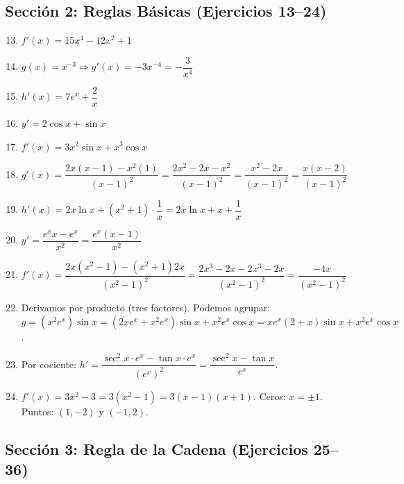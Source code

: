 \documentclass[12pt, a4paper]{article}
\begin{document}
\subsection*{Sección 2: Reglas Básicas (Ejercicios 13--24)}

\begin{enumerate}[leftmargin=*, label=\textbf{\arabic*.}]
  \setcounter{enumi}{12}
  \item $f'(x) = 15x^4 - 12x^2 + 1$
  \item $g(x) = x^{-3} \Rightarrow g'(x) = -3x^{-4} = -\dfrac{3}{x^4}$
  \item $h'(x) = 7e^x + \dfrac{2}{x}$
  \item $y' = 2\cos x + \sin x$
  \item $f'(x) = 3x^2 \sin x + x^3 \cos x$
  \item $g'(x) = \dfrac{2x(x - 1) - x^2(1)}{(x - 1)^2} = \dfrac{2x^2 - 2x - x^2}{(x - 1)^2} = \dfrac{x^2 - 2x}{(x - 1)^2} = \dfrac{x(x - 2)}{(x - 1)^2}$
  \item $h'(x) = 2x \ln x + (x^2 + 1) \cdot \dfrac{1}{x} = 2x\ln x + x + \dfrac{1}{x}$
  \item $y' = \dfrac{e^x x - e^x}{x^2} = \dfrac{e^x(x - 1)}{x^2}$
  \item $f'(x) = \dfrac{2x(x^2 - 1) - (x^2 + 1)2x}{(x^2 - 1)^2} = \dfrac{2x^3 - 2x - 2x^3 - 2x}{(x^2 - 1)^2} = \dfrac{-4x}{(x^2 - 1)^2}$
  \item Derivamos por producto (tres factores). Podemos agrupar: $g = (x^2 e^x) \sin x = (2x e^x + x^2 e^x)\sin x + x^2 e^x \cos x = x e^x(2 + x)\sin x + x^2 e^x \cos x$.
  \item Por cociente: $h' = \dfrac{\sec^2 x \cdot e^x - \tan x \cdot e^x}{(e^x)^2} = \dfrac{\sec^2 x - \tan x}{e^x}$.
  \item $f'(x) = 3x^2 - 3 = 3(x^2 - 1) = 3(x - 1)(x + 1)$. Ceros: $x = \pm 1$. Puntos: $(1, -2)$ y $(-1, 2)$.
\end{enumerate}

\subsection*{Sección 3: Regla de la Cadena (Ejercicios 25--36)}
\end{document}
